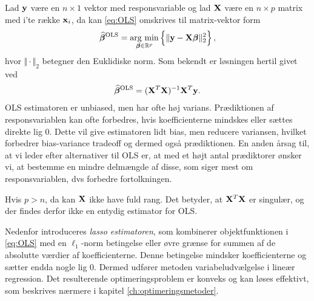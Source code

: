 Lad \(\mathbf{y}\) være en \(n \times 1\) vektor med responsvariable og lad \(\mathbf{X}\) være en $n \times p$ matrix med  i'te række $\mathbf{x}_i$, da kan \eqref{eq:OLS} omskrives til matrix-vektor form
\begin{align*}
\widehat{\tbeta}^\text{OLS} = \argmin_{ \tbeta \in \R^p} \cbr{ \Vert \y - \X \tbeta \Vert_2^2},
\end{align*}
hvor \(\Vert \cdot \Vert_2\) betegner den Euklidiske norm.
Som bekendt er løsningen hertil givet ved
\begin{align*}
\widehat{\boldsymbol{\beta}}^{\text{OLS}} = (\mathbf{X}^T \mathbf{X})^{-1} \mathbf{X}^T \mathbf{y}.
\end{align*}
OLS estimatoren er unbiased, men har ofte høj varians. 
Prædiktionen af responsvariablen kan ofte forbedres, hvis koefficienterne mindskes eller sættes direkte lig 0.
Dette vil give estimatoren lidt bias, men reducere variansen, hvilket forbedrer bias-variance tradeoff og dermed også prædiktionen.
En anden årsag til, at vi leder efter alternativer til OLS er, at med et højt antal prædiktorer ønsker vi, at bestemme en mindre delmængde af disse, som siger mest om responsvariablen, dvs forbedre fortolkningen.

Hvis \(p > n\), da kan \(\mathbf{X}\) ikke have fuld rang.
Det betyder, at $\mathbf{X}^T \mathbf{X}$ er singulær, og der findes derfor ikke en entydig estimator for OLS.

Nedenfor introduceres \textit{lasso estimatoren}, som kombinerer objektfunktionen i \eqref{eq:OLS} med en $\ell_1$-norm betingelse eller øvre grænse for summen af de absolutte værdier af koefficienterne.
Denne betingelse mindsker koefficienterne og sætter endda nogle lig 0. 
Dermed udfører metoden variabeludvælgelse i lineær regression.
Det resulterende optimeringsproblem er konveks og kan løses effektivt, som beskrives nærmere i kapitel \ref{ch:optimeringsmetoder}.
%



%